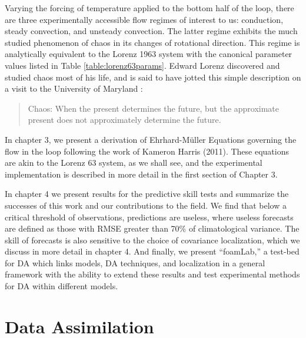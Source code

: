 \documentclass[12pt]{report}
\begin{document}
Varying the forcing of temperature applied to the bottom half of the loop, there are three experimentally accessible flow regimes of interest to us: conduction, steady convection, and unsteady convection.
The latter regime exhibits the much studied phenomenon of chaos in its changes of rotational direction.
This regime is analytically equivalent to the Lorenz 1963 system with the canonical parameter values listed in Table \ref{table:lorenz63params}.
Edward Lorenz discovered and studied chaos most of his life, and is said to have jotted this simple description on a visit to the University of Maryland \cite{danforth2013blog}:
\begin{quote}
Chaos: When the present determines the future, but the approximate present does not approximately determine the future.
\end{quote}

In chapter 3, we present a derivation of Ehrhard-M\"{u}ller Equations governing the flow in the loop following the work of Kameron Harris (2011).
These equations are akin to the Lorenz 63 system, as we shall see, and the experimental implementation is described in more detail in the first section of Chapter 3.

In chapter 4 we present results for the predictive skill tests and summarize the successes of this work and our contributions to the field.
We find that below a critical threshold of observations, predictions are useless, where useless forecasts are defined as those with RMSE greater than 70\% of climatological variance.
The skill of forecasts is also sensitive to the choice of covariance localization, which we discuss in more detail in chapter 4.
And finally, we present ``foamLab,'' a test-bed for DA which links models, DA techniques, and localization in a general framework with the ability to extend these results and test experimental methods for DA within different models.

\newcommand{\mbe}{\mathbf{\epsilon}}
\newcommand{\mbx}{\mathbf{x}}
\newcommand{\mby}{\mathbf{y}}
\newcommand{\mbd}{\mathbf{d}}
\newcommand{\mbB}{\mathbf{B}}
\newcommand{\mbW}{\mathbf{W}}
\newcommand{\mbR}{\mathbf{R}}
\newcommand{\mbH}{\mathbf{H}}
\newcommand{\mbK}{\mathbf{K}}
\newcommand{\mbP}{\mathbf{P}}
\newcommand{\mbZ}{\mathbf{Z}}
\newcommand{\mbw}{\mathbf{w}}
\newcommand{\mbX}{\mathbf{X}}
\newcommand{\mbY}{\mathbf{Y}}
\newcommand{\mb}{\mathbf{}}
\newcommand{\expv}[1]{E \left [ #1 \right ]}

\chapter{Data Assimilation}
\end{document}
